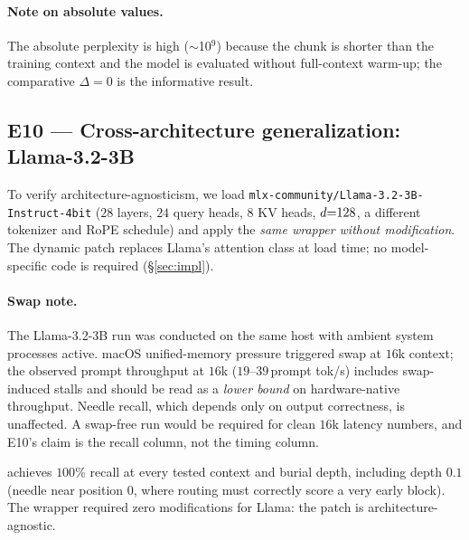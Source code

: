 \paragraph{Note on absolute values.} The absolute perplexity is high ($\sim$10$^9$) because the
chunk is shorter than the training context and the model is evaluated without full-context
warm-up; the comparative $\Delta = 0$ is the informative result.

\subsection{E10 --- Cross-architecture generalization: Llama-3.2-3B}
\label{sec:e10}
To verify architecture-agnosticism, we load
\texttt{mlx-community/Llama-3.2-3B-Instruct-4bit} ($28$ layers, $24$ query heads, $8$ KV heads,
$d{=}128$, a different tokenizer and RoPE schedule) and apply the \emph{same wrapper without
modification}. The dynamic patch replaces Llama's attention class at load time; no model-specific
code is required (\S\ref{sec:impl}).

\begin{\tabenv}[t]
  \centering
  \caption{Cross-architecture NIAH: Llama-3.2-3B-Instruct-4bit (int4, Apple~M3, $8.6$\,GB).
  Needle depth varies from $0.1$ (near the top) to $0.9$ (near the end). \emph{Prompt tok/s} is
  prompt tokens divided by end-to-end generation wall time (prefill-dominated), not per-token
  decode throughput. See swap note.}
  \label{tab:llama}
  \footnotesize
  
\end{\tabenv}

\paragraph{Swap note.} The Llama-3.2-3B run was conducted on the same host with ambient system
processes active. macOS unified-memory pressure triggered swap at $16$k context; the observed
prompt throughput at $16$k ($19$--$39$\,prompt tok/s) includes swap-induced stalls and should be
read as a \emph{lower bound} on hardware-native throughput. Needle recall, which depends only on
output correctness, is unaffected. A swap-free run would be required for clean $16$k latency
numbers, and E10's claim is the recall column, not the timing column.

\dkv{} achieves $100\%$ recall at every tested context and burial depth, including depth $0.1$
(needle near position $0$, where routing must correctly score a very early block). The wrapper
required zero modifications for Llama: the patch is architecture-agnostic.

